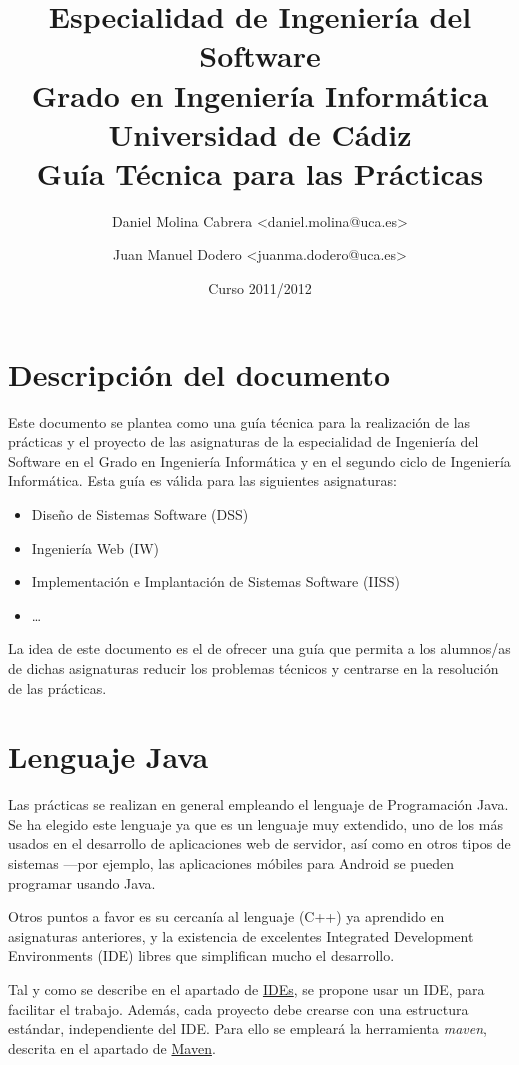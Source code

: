 \documentclass[11pt]{article}
\title{Especialidad de Ingeniería del Software\\ Grado en Ingeniería
Informática\\ Universidad de Cádiz\\ \textbf{Guía Técnica para las Prácticas}}
\author{Daniel Molina Cabrera <daniel.molina@uca.es> \and Juan Manuel Dodero
<juanma.dodero@uca.es>} \date{Curso 2011/2012}
\begin{document}
\maketitle


\setcounter{tocdepth}{2} \tableofcontents \vspace*{1cm} \newpage
\setlength{\parindent}{0pt} \setlength{\parskip}{1ex plus 0.5ex minus 0.2ex}


\section{Descripción del documento} \label{sec-1}



Este documento se plantea como una guía técnica para la realización de las
prácticas y el proyecto de las asignaturas de la especialidad de Ingeniería del
Software en el Grado en Ingeniería Informática y en el segundo ciclo de
Ingeniería Informática. Esta guía es válida para las siguientes asignaturas:

\begin{itemize} \item Diseño de Sistemas Software (DSS) \item Ingeniería Web
(IW) \item Implementación e Implantación de Sistemas Software (IISS) \item
\ldots \end{itemize}

La idea de este documento es el de ofrecer una guía que permita a los alumnos/as
de dichas asignaturas reducir los problemas técnicos y centrarse en la
resolución de las prácticas.


\section{Lenguaje Java} \label{sec-2} Las prácticas se realizan en general
empleando el lenguaje de Programación Java. Se ha elegido este lenguaje ya que
es un lenguaje muy extendido, uno de los más usados en el desarrollo de
aplicaciones web de servidor, así como en otros tipos de sistemas ---por
ejemplo, las aplicaciones móbiles para Android se pueden programar usando Java.

Otros puntos a favor es su cercanía al lenguaje (C++) ya aprendido en
asignaturas anteriores, y la existencia de excelentes Integrated Development
Environments (IDE) libres que simplifican mucho el desarrollo.

Tal y como se describe en el apartado de \hyperref[sec-3]{IDEs}, se propone usar
un IDE, para facilitar el trabajo. Además, cada proyecto debe crearse con una
estructura estándar, independiente del IDE. Para ello se empleará la herramienta
\emph{maven}, descrita en el apartado de \hyperref[sec-5]{Maven}.
\end{document}

